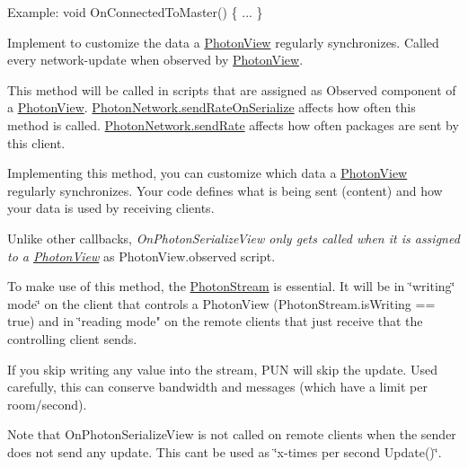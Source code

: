 \begin{Desc}
\begin{description}
Example\+: void On\+Connected\+To\+Master() \{ ... \} \item[{\em 
On\+Photon\+Serialize\+View\hypertarget{group__public_api_ggaf30bbea51cc8c4b1ddc239d1c5c1468fa864e7f0d7510922caf9c107b8dd771a3}{}\label{group__public_api_ggaf30bbea51cc8c4b1ddc239d1c5c1468fa864e7f0d7510922caf9c107b8dd771a3}
}]Implement to customize the data a \hyperlink{class_photon_view}{Photon\+View} regularly synchronizes. Called every \textquotesingle{}network-\/update\textquotesingle{} when observed by \hyperlink{class_photon_view}{Photon\+View}. 

This method will be called in scripts that are assigned as Observed component of a \hyperlink{class_photon_view}{Photon\+View}. \hyperlink{class_photon_network_ac23d14ad150a87d51f4ffaa286db29e1}{Photon\+Network.\+send\+Rate\+On\+Serialize} affects how often this method is called. \hyperlink{class_photon_network_a154fc601fac7f0fddd704231189457fb}{Photon\+Network.\+send\+Rate} affects how often packages are sent by this client.

Implementing this method, you can customize which data a \hyperlink{class_photon_view}{Photon\+View} regularly synchronizes. Your code defines what is being sent (content) and how your data is used by receiving clients.

Unlike other callbacks, {\itshape On\+Photon\+Serialize\+View only gets called when it is assigned to a \hyperlink{class_photon_view}{Photon\+View}} as Photon\+View.\+observed script.

To make use of this method, the \hyperlink{class_photon_stream}{Photon\+Stream} is essential. It will be in \char`\"{}writing\char`\"{} mode\char`\"{} on the
    client that controls a Photon\+View (\+Photon\+Stream.\+is\+Writing == true) and in \char`\"{}reading mode" on the remote clients that just receive that the controlling client sends.

If you skip writing any value into the stream, P\+UN will skip the update. Used carefully, this can conserve bandwidth and messages (which have a limit per room/second).

Note that On\+Photon\+Serialize\+View is not called on remote clients when the sender does not send any update. This can\textquotesingle{}t be used as \char`\"{}x-\/times per second Update()\char`\"{}.


\end{description}
\end{Desc}
